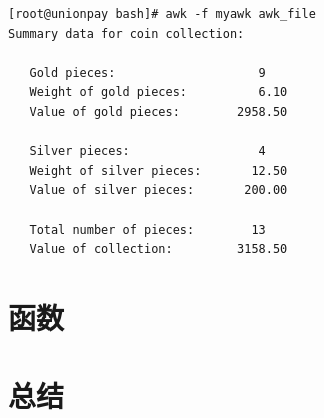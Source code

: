 \begin{verbatim}
[root@unionpay bash]# awk -f myawk awk_file 
Summary data for coin collection:

   Gold pieces:                    9
   Weight of gold pieces:          6.10
   Value of gold pieces:        2958.50

   Silver pieces:                  4
   Weight of silver pieces:       12.50
   Value of silver pieces:       200.00

   Total number of pieces:        13
   Value of collection:         3158.50
\end{verbatim}

\section{函数}

\section{总结}
